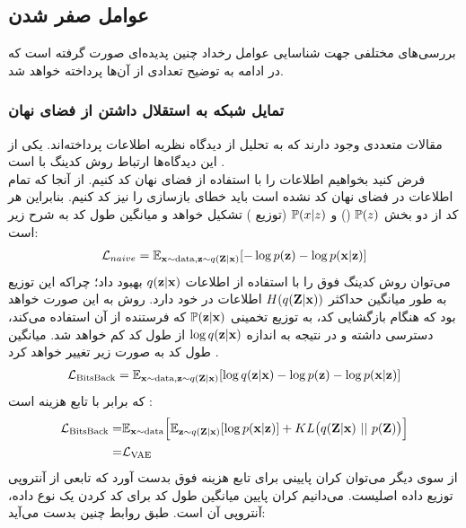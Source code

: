 \subsection{عوامل صفر شدن }
بررسی‌های مختلفی جهت شناسایی عوامل رخداد چنین پدیده‌ای صورت گرفته است که در ادامه به توضیح تعدادی از آن‌ها پرداخته خواهد شد.
\subsubsection{تمایل شبکه \decoder{}
	به استقلال داشتن از فضای نهان}
مقالات متعددی وجود دارند که به تحلیل \vae{} از دیدگاه نظریه اطلاعات پرداخته‌اند. یکی از این دیدگاه‌ها ارتباط روش کدینگ \bitsback{} با \vae{} است \cite{vae_lossy}.\\
فرض کنید بخواهیم اطلاعات را با استفاده از فضای نهان \vae{} کد کنیم. از آنجا که تمام اطلاعات در فضای نهان کد نشده است باید خطای بازسازی را نیز کد کنیم. بنابراین هر کد از دو بخش
$\mathbb P(z)$
(\priordist{})
و $\mathbb P(x|z)$
(توزیع \decoder{})
تشکیل خواهد و میانگین طول کد به شرح زیر است:
\begin{gather}
	\mathcal{L}_{naive} = \mathbb E_{{\bf x} \sim \text{data}, {\bf z} \sim q({\bf Z}|{\bf x})} [-\log p({\bf z}) - \log p({\bf x}|{\bf z})]
\end{gather}
می‌توان روش کدینگ فوق را با استفاده از اطلاعات $q({\bf z}|{\bf x})$ بهبود داد؛ چراکه این توزیع به طور میانگین حداکثر $H(q({\bf Z}|{\bf x}))$   اطلاعات در خود دارد. روش به این صورت خواهد بود که \decoder{} هنگام بازگشایی کد، به توزیع تخمینی $\mathbb P({\bf z}|{\bf x})$ که فرستنده از آن استفاده می‌کند، دسترسی داشته و در نتیجه به اندازه $\log q({\bf z}|{\bf x})$ از طول کد کم خواهد شد. میانگین طول کد به صورت زیر تغییر خواهد کرد \cite{vae_lossy}.
\begin{gather}
	\mathcal{L}_{\text{BitsBack}} = \mathbb E_{{\bf x} \sim \text{data}, {\bf z} \sim q({\bf Z}|{\bf x})} [\log q({\bf z}|{\bf x}) -\log p({\bf z}) - \log p({\bf x}|{\bf z})]
\end{gather}
که برابر با تابع هزینه \vae{} است \cite{vae_lossy}:
\begin{gather}
	\begin{align}
		\mathcal{L}_{\text{BitsBack}} = & \mathbb E_{{\bf x} \sim \text{data}} \Big[\mathbb E_{{\bf z} \sim q({\bf Z}|{\bf x})} [\log p({\bf x}|{\bf z})] + KL\big(q({\bf Z}|{\bf x}) ~||~ p({\bf Z})\big)\Big] \nonumber
		\\
		=                               & \mathcal{L}_{\text{VAE}}
	\end{align}
\end{gather}
از سوی دیگر می‌توان کران پایینی برای تابع هزینه فوق بدست آورد که تابعی از آنتروپی توزیع داده اصلیست. می‌دانیم کران پایین میانگین طول کد برای کد کردن یک نوع داده، آنتروپی آن است. طبق روابط چنین بدست می‌آید:
